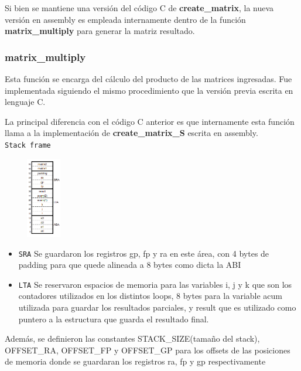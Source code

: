 \documentclass[a4paper,10pt, spanish]{article}
\begin{document}
Si bien se mantiene una versión del código C de \textbf{create\_matrix}, la nueva versión en assembly es empleada internamente dentro de la función \textbf{matrix\_multiply} para generar la matriz resultado.

\subsubsection{matrix\_multiply}

Esta función se encarga del cálculo del producto de las matrices ingresadas. Fue implementada siguiendo el mismo procedimiento que la versión previa escrita en lenguaje C. 

La principal diferencia con el código C anterior es que internamente esta función llama a la implementación de \textbf{create\_matrix\_S} escrita en assembly.\\

\lstinline{Stack frame} \\
            \begin{center}
              \includegraphics[max height=100pt,max width=100pt]{./stack_matrix_multiply.png}
            \end{center}
            \begin{itemize}
                \item \lstinline{SRA}
                Se guardaron los registros gp, fp y ra en este área, con 4 bytes de padding para que quede alineada a 8 bytes como dicta la ABI
                \item \lstinline{LTA}
                Se reservaron espacios de memoria para las variables i, j y k que son los contadores utilizados en los distintos loops, 8 bytes para la variable acum utilizada para guardar los resultados parciales, y result que es utilizado como puntero a la estructura que guarda el resultado final.
            \end{itemize}

           Además, se definieron las constantes STACK\_SIZE(tamaño del stack), OFFSET\_RA, OFFSET\_FP y OFFSET\_GP para los offsets de las posiciones de memoria donde se guardaran los registros ra, fp y gp respectivamente
\end{document}

